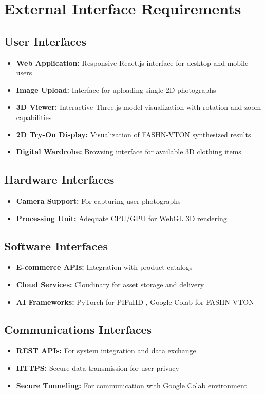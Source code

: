 \documentclass[12pt,a4paper,oneside]{report}
\begin{document}
\section{External Interface Requirements}

\subsection{User Interfaces}
\begin{itemize}
    \item \textbf{Web Application:} Responsive React.js interface for desktop and mobile users
    \item \textbf{Image Upload:} Interface for uploading single 2D photographs
    \item \textbf{3D Viewer:} Interactive Three.js model visualization with rotation and zoom capabilities \cite{6}
    \item \textbf{2D Try-On Display:} Visualization of FASHN-VTON synthesized results \cite{16}
    \item \textbf{Digital Wardrobe:} Browsing interface for available 3D clothing items
\end{itemize}

\subsection{Hardware Interfaces}
\begin{itemize}
    \item \textbf{Camera Support:} For capturing user photographs
    \item \textbf{Processing Unit:} Adequate CPU/GPU for WebGL 3D rendering
\end{itemize}

\subsection{Software Interfaces}
\begin{itemize}
    \item \textbf{E-commerce APIs:} Integration with product catalogs
    \item \textbf{Cloud Services:} Cloudinary for asset storage and delivery
    \item \textbf{AI Frameworks:} PyTorch for PIFuHD \cite{1}, Google Colab for FASHN-VTON \cite{16}
\end{itemize}

\subsection{Communications Interfaces}
\begin{itemize}
    \item \textbf{REST APIs:} For system integration and data exchange
    \item \textbf{HTTPS:} Secure data transmission for user privacy
    \item \textbf{Secure Tunneling:} For communication with Google Colab environment
\end{itemize}
\end{document}

